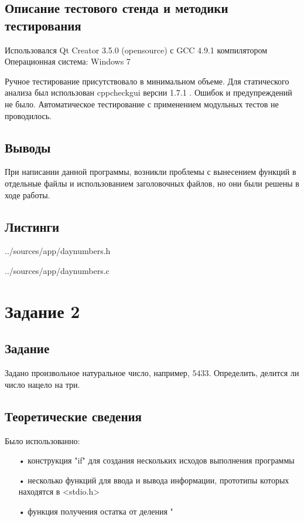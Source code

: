 \documentclass[12pt,a4paper]{report}
\begin{document}
\subsection{Описание тестового стенда и методики тестирования}
Использовался Qt Creator 3.5.0 (opensource) с GCC 4.9.1 компилятором
Операционная система: Windows 7


Ручное тестирование присутствовало в минимальном объеме.
Для статического анализа был использован cppcheckgui версии 1.7.1 . Ошибок и предупреждений не было.
Автоматическое тестирование с применением модульных тестов не проводилось.


\subsection{Выводы}

При написании данной программы, возникли проблемы с вынесением функций в отдельные файлы и использованием заголовочных файлов, но они были решены в ходе работы.

\subsection{Листинги}

{../sources/app/daynumbers.h}

{../sources/app/daynumbers.c}



\section{Задание 2}
\subsection{Задание}
Задано произвольное натуральное число, например, $5433$. Определить, делится ли число нацело на три.
\subsection{Теоретические сведения}

Было использованно:
\begin{enumerate}
\item[•] конструкция "if" для создания нескольких исходов выполнения программы
\item[•] несколько функций для ввода и вывода информации, прототипы которых находятся в <stdio.h>
\item[•] функция получения остатка от деления " %
\end{enumerate}
\end{document}
